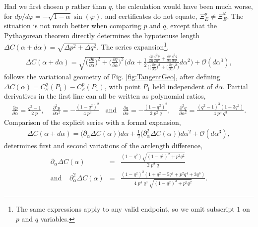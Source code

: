 \documentclass[nofootinbib,preprint]{revtex4-1}
\begin{document}
Had we first chosen $p$ rather than $q$, the calculation would have been much worse, 
for ${dp/d\varphi = -\sqrt{1-\alpha}\sin(\varphi)}$, and certificates do not equate,
$\Xi^{p}_{E} \neq \Xi^{\varphi}_{E}$. The situation is not much better when comparing 
$p$ and $q$, except that the Pythagorean theorem directly determines the  
hypotenuse length $\Delta C(\alpha + d\alpha)=\sqrt{\Delta p^2 + \Delta q^2}$. 
The series expansion\footnote{The same expressions apply to any 
valid endpoint, so we omit subscript $1$ on $p$ and $q$ variables.},
\begin{eqnarray}
\Delta C(\alpha + d\alpha) = \sqrt{\Big(\frac{\partial p}{\partial \alpha}\Big)^2
+\Big(\frac{\partial q}{\partial \alpha}\Big)^2}\Bigg(
 d\alpha + \frac{1}{2}\frac{
\frac{\partial p}{\partial \alpha}\frac{\partial^2 p}{\partial \alpha^2}
+\frac{\partial q}{\partial \alpha}\frac{\partial^2 q}{\partial \alpha^2} 
 }{\Big( \big(\frac{\partial p}{\partial \alpha}\big)^2
+\big(\frac{\partial q}{\partial \alpha}\big)^2 \Big)}d\alpha^2
\Bigg) + \mathcal{O}(d\alpha^3),  \nonumber 
\end{eqnarray}
follows the variational geometry of Fig. \ref{fig:TangentGeo},
after defining 
$\Delta C(\alpha) = C^{q}_{\mathcal{E}}(P_1) - C^{p}_{\mathcal{E}}(P_1)$,
with point $P_1$ held independent of $d\alpha$. Partial derivatives in 
the first line can all be written as polynomial ratios,
\begin{eqnarray}
\frac{\partial p}{\partial \alpha} = \frac{q^2-1}{2\;p}, \;\;\;\;
\frac{\partial^2 p}{\partial \alpha^2} = -\frac{(1-q^2)^2}{4\;p^3}
\;\;\; \text{and} \;\;\;
\frac{\partial q}{\partial \alpha} = -\frac{(1-q^2)^2}{2 \; p^2 \; q}, \;\;\;\;
\frac{\partial^2 q}{\partial \alpha^2} = \frac{(q^2-1)^3(1+3q^2)}{4\;p^4 \;q^3}.
\nonumber
\end{eqnarray}
Comparison of the explicit series with a formal expansion, 
\begin{eqnarray}
\Delta C(\alpha + d\alpha) = \Big(\partial_{\alpha}\Delta C(\alpha)\Big)d\alpha
+\frac{1}{2}\Big(\partial_{\alpha}^2 \Delta C(\alpha)\Big)d\alpha^2
+\mathcal{O}(d\alpha^3), \nonumber  
\end{eqnarray}
determines first and second variations of the arclength difference,
\begin{eqnarray}
\partial_{\alpha}\Delta C(\alpha) &=& \frac{(1-q^2)\sqrt{(1-q^2)^2+p^2 q^2}}{2\;p^2\;q} 
\nonumber \\ \text{and} \;\;\;\;
 \partial_{\alpha}^2\Delta C(\alpha) 
 &=& \frac{(1-q^2)^2(1+q^2-5q^4+p^2 q^4+3 q^6)
 }{4 \; p^4 \; q^3 \;\sqrt{(1-q^2)^2+p^2 q^2}}.
 \nonumber 
\end{eqnarray}
\end{document}
